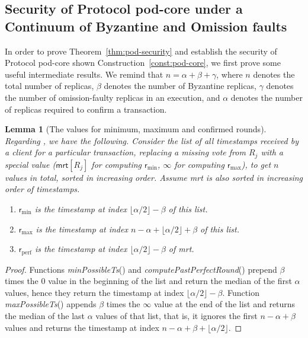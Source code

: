 \documentclass[pdflatex,sn-mathphys-num]{sn-jnl}%
\theoremstyle{thmstyleone}%
\theoremstyle{thmstyletwo}%
\theoremstyle{thmstylethree}%
\newtheorem{lemma}{Lemma}
\newcommand{\podtm}{\textsf{pod}\xspace}
\newcommand{\op}[1]{\textsl{#1}}
\newcommand{\opMinPossibleTs}[1]{\op{minPossibleTs}(#1)\xspace}
\newcommand{\opMaxPossibleTs}[1]{\op{maxPossibleTs}(#1)\xspace}
\newcommand{\opMinPossibleTsForNewTx}[1]{\op{computePastPerfectRound}(#1)\xspace}
\newcommand{\operand}[1]{\textsf{#1}}
\newcommand{\round}{\operand{r}\xspace}
\newcommand{\rmin}{\ensuremath{\round_\text{min}}\xspace}
\newcommand{\rmax}{\ensuremath{\round_\text{max}}\xspace}
\newcommand{\rperf}{\ensuremath{\round_\text{perf}}\xspace}
\newcommand{\rep}{\ensuremath{R}\xspace}
\newcommand{\mrt}{\operand{mrt}\xspace}
\newcommand{\confirmed}{confirmed\xspace}
\let\oldalpha\alpha
\renewcommand{\alpha}{\ensuremath{\oldalpha}\xspace}
\let\oldbeta\beta
\renewcommand{\beta}{\ensuremath{\oldbeta}\xspace}
\let\oldgamma\gamma
\renewcommand{\gamma}{\ensuremath{\oldgamma}\xspace}
\begin{document}
\begin{appendices}
\section{Security of Protocol \podtm-core under a Continuum of Byzantine and Omission faults}\label{app:pod-security}
In order to prove Theorem~\ref{thm:pod-security} and establish the security of Protocol \podtm-core shown Construction~\ref{const:pod-core}, we first prove some useful intermediate results. We remind that $n = \alpha + \beta + \gamma$, where $n$ denotes the total number of replicas, $\beta$ denotes the number of Byzantine replicas, \gamma denotes the number of omission-faulty replicas in an execution, and \alpha denotes the number of replicas required to confirm a transaction.

\begin{lemma}[The values for minimum, maximum and \confirmed rounds]\label{lem:assign-min-max}
	Regarding , we have the following.
	Consider the list of all timestamps received by a client for a particular transaction, replacing a missing vote from $\rep_j$ with a special value ($\mrt[\rep_j]$ for computing \rmin, $\infty$ for computing \rmax), to get $n$ values in total, sorted in increasing order.
	Assume \mrt is also sorted in increasing order of timestamps.
	\begin{enumerate}
		\item \rmin is the timestamp at index $\lfloor \alpha / 2 \rfloor - \beta$ of this list.
		\item \rmax is the timestamp at index $n - \alpha + \lfloor \alpha / 2 \rfloor + \beta$ of this list.
		\item \rperf is the timestamp at index $\lfloor \alpha / 2 \rfloor - \beta$ of \mrt.
	\end{enumerate}
\end{lemma}
\begin{proof}
	Functions \opMinPossibleTs{} and \opMinPossibleTsForNewTx{} prepend \beta times the $0$ value in the beginning of the list and return the median of the first \alpha values, hence they return the timestamp at index $\lfloor \alpha / 2 \rfloor - \beta$.
	Function \opMaxPossibleTs{} appends \beta times the $\infty$ value at the end of the list and returns the median of the last \alpha values of that list, that is, it ignores the first $n - \alpha  + \beta$ values and returns the timestamp at index $n - \alpha  + \beta + \lfloor \alpha / 2 \rfloor$.
\end{proof}


\end{appendices}
\end{document}

